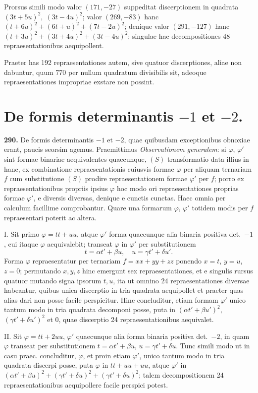 \documentclass[12pt,a4paper]{article}
\theoremstyle{plain}
\theoremstyle{definition}
\theoremstyle{remark}
\begin{document}
Prorsus simili modo valor $(171,-27)$ suppeditat discerptionem in quadrata $(3t+5u)^2,\; (3t-4u)^2$; valor $(269,-83)$ hanc $(t+6u)^2 + (6t+u)^2 + (7t-2u)^2$; denique valor $(291,-127)$ hanc $(t+3u)^2 + (3t+4u)^2 + (3t-4u)^2$; singulae hae decompositiones 48 repraesentationibus aequipollent.

Praeter has 192 repraesentationes autem, sive quatuor discerptiones, aliae non dabuntur, quum 770 per nullum quadratum divisibilis sit, adeoque repraesentationes impropriae exstare non possint.


\section*{De formis determinantis $-1$ et $-2$.}

\textbf{290.} De formis determinantis $-1$ et $-2$, quae quibusdam exceptionibus obnoxiae erant, paucis seorsim agemus. Praemittimus \textit{Observationem generalem}: si $\varphi$, $\varphi'$ sint formae binariae aequivalentes quaecunque, $(S)$ transformatio data illius in hanc, ex combinatione repraesentationis cuiusvis formae $\varphi$ per aliquam ternariam $f$ cum substitutione $(S)$ prodire repraesentationem formae $\varphi'$ per $f$; porro ex repraesentationibus propriis ipsius $\varphi$ hoc modo ori repraesentationes proprias formae $\varphi'$, e diversis diversas, denique e cunctis cunctas. Haec omnia per calculum facillime comprobantur. Quare una formarum $\varphi$, $\varphi'$ totidem modis per $f$ repraesentari poterit ac altera.

\textsc{I.} Sit primo $\varphi = tt + uu$, atque $\varphi'$ forma quaecunque alia binaria positiva det.~$-1$, cui itaque $\varphi$ aequivalebit; transeat $\varphi$ in $\varphi'$ per substitutionem
\[
t = \alpha t' + \beta u,\quad u = \gamma t' + \delta u'.
\]
Forma $\varphi$ repraesentatur per ternariam $f = xx + yy + zz$ ponendo $x=t$, $y=u$, $z=0$; permutando $x,y,z$ hinc emergunt sex repraesentationes, et e singulis rursus quatuor mutando signa ipsorum $t,u$, ita ut omnino 24 repraesentationes diversae habeantur, quibus unica discerptio in tria quadrata aequipollet et praeter quas alias dari non posse facile perspicitur. Hinc concluditur, etiam formam $\varphi'$ unico tantum modo in tria quadrata decomponi posse, puta in $(\alpha t' + \beta u')^2$, $(\gamma t' + \delta u')^2$ et $0$, quae discerptio 24 repraesentationibus aequivalet.

\textsc{II.} Sit $\varphi = tt + 2uu$, $\varphi'$ quaecunque alia forma binaria positiva det.~$-2$, in quam $\varphi$ transeat per substitutionem $t = \alpha t' + \beta u$, $u = \gamma t' + \delta u$. Tunc simili modo ut in casu praec. concluditur, $\varphi$, et proin etiam $\varphi'$, unico tantum modo in tria quadrata discerpi posse, puta $\varphi$ in $tt + uu + uu$, atque $\varphi'$ in $(\alpha t' + \beta u)^2 + (\gamma t' + \delta u)^2 + (\gamma t' + \delta u)^2$; talem decompositionem 24 repraesentationibus aequipollere facile perspici potest.
\end{document}
